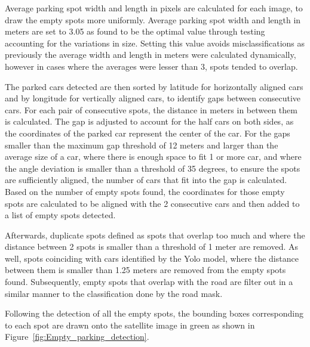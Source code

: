 Average parking spot width and length in pixels are calculated for each image, to draw the empty spots more uniformly. Average parking spot width and length in meters are set to 3.05 as found to be the optimal value through testing accounting for the variations in size.
Setting this value avoids misclassifications as previously the average width and length in meters were calculated dynamically, however in cases where the averages were lesser than 3, spots tended to overlap.

The parked cars detected are then sorted by latitude for horizontally aligned cars and by longitude for vertically aligned cars, to identify gaps between consecutive cars.
For each pair of consecutive spots, the distance in meters in between them is calculated. The gap is adjusted to account for the half cars on both sides, as the coordinates of the parked car represent the center of the car.
For the gaps smaller than the maximum gap threshold of 12 meters and larger than the average size of a car, where there is enough space to fit 1 or more car, and where the angle deviation is smaller than a threshold of 35 degrees, to ensure the spots are sufficiently aligned, the number of cars that fit into the gap is calculated.
Based on the number of empty spots found, the coordinates for those empty spots are calculated to be aligned with the 2 consecutive cars and then added to a list of empty spots detected.

Afterwards, duplicate spots defined as spots that overlap too much and where the distance between 2 spots is smaller than a threshold of 1 meter are removed.
As well, spots coinciding with cars identified by the Yolo model, where the distance between them is smaller than 1.25 meters are removed from the empty spots found.
Subsequently, empty spots that overlap with the road are filter out in a similar manner to the classification done by the road mask.

Following the detection of all the empty spots, the bounding boxes corresponding to each spot are drawn onto the satellite image in green as shown in Figure~\ref{fig:Empty_parking_detection}.


